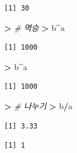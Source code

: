 \documentclass[11pt,a4paper]{book}
\newenvironment{Shaded}{\begin{snugshade}}{\end{snugshade}}
\newcommand{\StringTok}[1]{\textcolor[rgb]{0.31,0.60,0.02}{#1}}
\newcommand{\CommentTok}[1]{\textcolor[rgb]{0.56,0.35,0.01}{\textit{#1}}}
\newcommand{\OperatorTok}[1]{\textcolor[rgb]{0.81,0.36,0.00}{\textbf{#1}}}
\newcommand{\ErrorTok}[1]{\textcolor[rgb]{0.64,0.00,0.00}{\textbf{#1}}}
\newcommand{\NormalTok}[1]{#1}
\theoremstyle{definition}
\theoremstyle{definition}
\theoremstyle{definition}
\theoremstyle{remark}
\begin{document}
\begin{verbatim}
[1] 30
\end{verbatim}

\begin{Shaded}
\begin{Highlighting}[]
\OperatorTok{>}\StringTok{ }\CommentTok{# 멱승}
\ErrorTok{>}\StringTok{ }\NormalTok{b}\OperatorTok{^}\NormalTok{a}
\end{Highlighting}
\end{Shaded}

\begin{verbatim}
[1] 1000
\end{verbatim}

\begin{Shaded}
\begin{Highlighting}[]
\OperatorTok{>}\StringTok{ }\NormalTok{b}\OperatorTok{^}\NormalTok{a}
\end{Highlighting}
\end{Shaded}

\begin{verbatim}
[1] 1000
\end{verbatim}

\begin{Shaded}
\begin{Highlighting}[]
\OperatorTok{>}\StringTok{ }\CommentTok{# 나누기}
\ErrorTok{>}\StringTok{ }\NormalTok{b}\OperatorTok{/}\NormalTok{a}
\end{Highlighting}
\end{Shaded}

\begin{verbatim}
[1] 3.33
\end{verbatim}

\begin{Shaded}
\end{Shaded}

\begin{verbatim}
[1] 1
\end{verbatim}

\begin{Shaded}
\end{Shaded}
\end{document}
